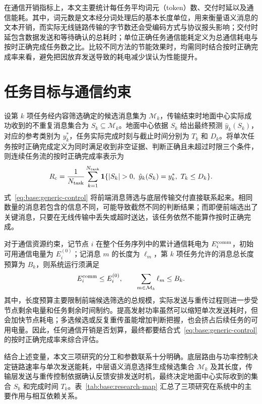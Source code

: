 在通信开销指标上，本文主要统计每任务平均词元（token）数、交付时延以及通信能耗。其中，词元数是文本经分词处理后的基本长度单位，用来衡量语义消息的文本开销，而实际无线链路传输的字节数还会受编码方式与协议报头影响；交付时延包含数据发送和等待确认的总耗时；单位正确任务通信能耗定义为总通信耗电与按时正确完成任务数之比。比较不同方法的节能效果时，均需同时结合按时正确完成率来看，避免把因放弃发送导致的耗电减少误认为性能提升。

\section{任务目标与通信约束}
\label{sec:base:task-objective}

设第 $k$ 项任务经内容筛选确定的候选消息集为 $\mathcal M_k$，传输结束时地面中心实际成功收到的不重复消息集合为 $S_k\subseteq\mathcal M_k$。地面中心依据 $S_k$ 给出最终预测 $\hat y_k(S_k)$，对应的参考类别为 $y_k^*$，任务实际完成时刻与截止时间分别为 $T_k$ 和 $D_k$。将单次任务按时正确完成定义为同时满足收到非空证据、判断正确且未超过时限三个条件，则连续任务流的按时正确完成率表示为
\begin{equation}
R_{\rm c}=\frac{1}{N_{\rm task}}\sum_{k=1}^{N_{\rm task}}
\mathbf1\{|S_k|>0,\ \hat y_k(S_k)=y_k^*,\ T_k\le D_k\}.
\label{eq:base:generic-control}
\end{equation}
式~\eqref{eq:base:generic-control} 将前端消息筛选与底层传输交付直接联系起来。相同数量的消息若包含的信息不同，可能导致截然不同的判断结果；而即便前端选出了关键消息，只要在无线传输中丢失或超时送达，该任务依然不能算作按时正确完成。

对于通信资源约束，记节点 $i$ 在整个任务序列中的累计通信耗电为 $E_i^{\rm comm}$，初始可用通信电量为 $E_i^{(0)}$；记消息 $m$ 的长度为 $\ell_m$，第 $k$ 项任务允许的消息总长度预算为 $B_k$，则系统运行须满足
\begin{equation}
E_i^{\rm comm}\le E_i^{(0)},\qquad
\sum_{m\in\mathcal M_k}\ell_m\le B_k.
\label{eq:base:resource-constraints}
\end{equation}
其中，长度预算主要限制前端候选筛选的总规模，实际发送与重传过程则进一步受节点剩余电量和任务剩余时间制约。提高发射功率虽然可以缩短单次发送耗时，但会加快节点耗电；多选候选或反复重传虽能增加判断把握，也会挤占后续任务的可用电量。因此，任何通信开销是否划算，最终都要结合式~\eqref{eq:base:generic-control} 的按时正确完成率来综合评估。

结合上述变量，本文三项研究的分工和参数联系十分明确。底层路由与功率控制决定链路速率与单次发送能耗，中层语义消息选择生成候选集合 $\mathcal M_k$ 及其长度，传输层发送与重传控制依据确认反馈安排发送时机，最终决定地面中心实际收到的集合 $S_k$ 和完成时间 $T_k$。表~\ref{tab:base:research-map} 汇总了三项研究在系统中的主要作用与相互依赖关系。

